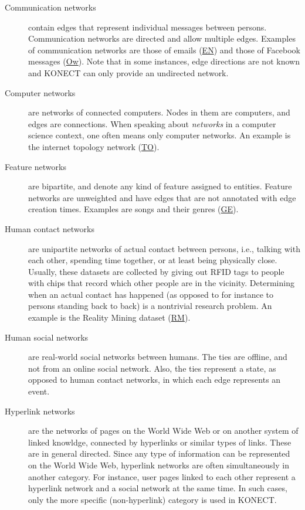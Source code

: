 \documentclass{article}
\begin{document}
\begin{description}
\item[Communication networks] contain edges that represent
  individual messages between persons.  Communication networks are directed
  and allow multiple edges.  
  Examples of communication networks are those of
  emails (\href{http://konect.cc/networks/enron/}{\textsf{EN}})
  and those of
  Facebook messages
  (\href{http://konect.cc/networks/facebook-wosn-wall/}{\textsf{Ow}}). Note
  that in some instances, edge directions are not 
  known and KONECT can only provide an undirected network. 

\item[Computer networks] are networks of connected computers. 
  Nodes in them are computers, and edges are connections. 
  When speaking about \emph{networks} in a computer science context, one
  often means only computer networks.  An example is the internet
  topology network (\href{http://konect.cc/networks/topology/}{\textsf{TO}}).

\item[Feature networks] are bipartite, and denote any kind of feature
  assigned to entities. Feature networks are unweighted and have
  edges that are not annotated with edge creation times.  Examples are
  songs and their genres
  (\href{http://konect.cc/networks/dbpedia-genre/}{\textsf{GE}}).   

\item[Human contact networks] are unipartite networks of actual contact
  between persons, i.e., talking with each other, spending time
  together, or at least being physically close.  Usually, these datasets
  are collected by giving out RFID tags to people with chips that record
  which other people are in the vicinity.  Determining when an actual
  contact has happened (as opposed to for instance to persons standing
  back to back) is a nontrivial research problem. 
  An example is the Reality Mining dataset
  (\href{http://konect.cc/networks/mit/}{\textsf{RM}}). 

\item[Human social networks] are real-world social networks between
  humans.   The ties are offline,
  and not from an online social network.  Also, the ties represent a
  state, as opposed to human contact networks, in which each edge
  represents an event.

\item[Hyperlink networks] are the
  networks  of pages on the World Wide Web
  or on another system of linked knowldge,
  connected by hyperlinks or similar types of links.  These are in general directed.  Since any
  type of information can be represented on the World Wide Web,
  hyperlink networks are often simultaneously in another category.  For
  instance, user pages linked to each other represent a hyperlink
  network and a social network at the same time.  In such cases, only
  the more specific (non-hyperlink) category is used in KONECT.


\end{description}
\end{document}
